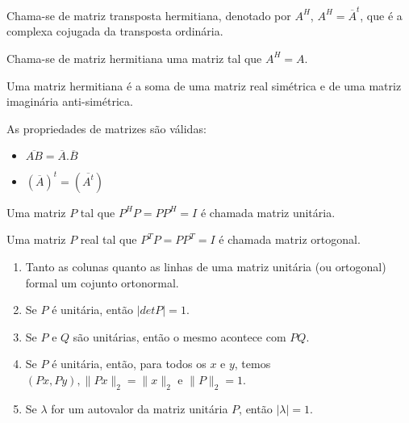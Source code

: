 \begin{definition}
Chama-se de matriz transposta hermitiana, denotado por $A^H$, $A^H = \overline{A}^t$, que é a complexa cojugada da transposta ordinária.
\end{definition}

\begin{definition}
Chama-se de matriz hermitiana uma matriz tal que $A^H = A$.
\end{definition}

\begin{lemma}
Uma matriz hermitiana é a soma de uma matriz real simétrica e de uma matriz imaginária anti-simétrica.
\end{lemma}

\begin{lemma}
As propriedades de matrizes são válidas:
	\begin{itemize}
		\item $\overline{AB} = \overline{A}.\overline{B}$
		\item $(\overline{A})^t = (\overline{A^t})$
	\end{itemize}
\end{lemma}

\begin{definition}
	Uma matriz $P$ tal que $P^HP = PP^H = I$ é chamada matriz unitária. 
\end{definition}

\begin{definition}
	Uma matriz $P$ real tal que $P^TP = PP^T = I$ é chamada matriz ortogonal.
\end{definition}

\begin{theorem}
	\begin{enumerate}[label=(\roman*)]
		\item Tanto as colunas quanto as linhas de uma matriz unitária (ou ortogonal) formal um cojunto ortonormal.
		\item Se $P$ é unitária, então $|det P| = 1$.
		\item Se $P$ e $Q$ são unitárias, então o mesmo acontece com $PQ$.
		\item Se $P$ é unitária, então, para todos os $x$ e $y$, temos $(Px, Py), \lVert Px \rVert_2 = \lVert x \rVert_2$ e $\lVert P \rVert_2 = 1$.
		\item Se $\lambda$ for um autovalor da matriz unitária $P$, então $|\lambda| = 1$.
	\end{enumerate}
\end{theorem}


